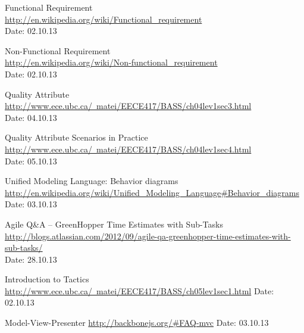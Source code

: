 \begin{thebibliography}{99}
	Functional Requirement \\
	\href{http://en.wikipedia.org/wiki/Functional_requirement}{http://en.wikipedia.org/wiki/Functional\_requirement} \\
	Date: 02.10.13

	Non-Functional Requirement \\
	\href{http://en.wikipedia.org/wiki/Non-functional_requirement}{http://en.wikipedia.org/wiki/Non-functional\_requirement} \\
	Date: 02.10.13

	Quality Attribute \\
	\href{http://www.ece.ubc.ca/~matei/EECE417/BASS/ch04lev1sec3.html}{http://www.ece.ubc.ca/~matei/EECE417/BASS/ch04lev1sec3.html} \\
	Date: 04.10.13

	Quality Attribute Scenarios in Practice \\ 
	\href{http://www.ece.ubc.ca/~matei/EECE417/BASS/ch04lev1sec4.html}{http://www.ece.ubc.ca/~matei/EECE417/BASS/ch04lev1sec4.html} \\
	Date: 05.10.13

	Unified Modeling Language: Behavior diagrams
	\href {http://en.wikipedia.org/wiki/Unified_Modeling_Language#Behavior_diagrams }{http://en.wikipedia.org/wiki/Unified\_Modeling\_Language\#Behavior\_diagrams}
	Date: 03.10.13

	Agile Q\&A – GreenHopper Time Estimates with Sub-Tasks \\
	\href{http://blogs.atlassian.com/2012/09/agile-qa-greenhopper-time-estimates-with-sub-tasks/}{http://blogs.atlassian.com/2012/09/agile-qa-greenhopper-time-estimates-with-sub-tasks/} \\
	Date: 28.10.13


	Introduction to Tactics \newline
	\href {http://www.ece.ubc.ca/~matei/EECE417/BASS/ch05lev1sec1.html}{http://www.ece.ubc.ca/~matei/EECE417/BASS/ch05lev1sec1.html} \newline
	Date: 02.10.13

	Model-View-Presenter\newline
	\href {http://backbonejs.org/\#FAQ-mvc}{http://backbonejs.org/\#FAQ-mvc}\newline
	Date: 03.10.13


\end{thebibliography}
